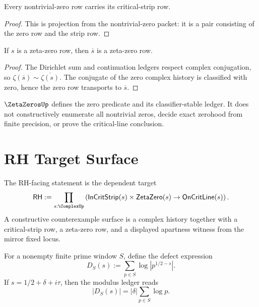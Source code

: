 \begin{theorem}
\label{thm:number-theory-spine-nontrivial-zero-strip}
Every nontrivial-zero row carries its critical-strip row.
\end{theorem}

\begin{proof}
This is projection from the nontrivial-zero packet: it is a pair consisting
of the zero row and the strip row.
\end{proof}

\begin{theorem}
\label{thm:number-theory-spine-zero-conjugate}
If $s$ is a zeta-zero row, then $\overline{s}$ is a zeta-zero row.
\end{theorem}

\begin{proof}
The Dirichlet sum and continuation ledgers respect complex conjugation, so
$\zeta(\overline{s})\sim\overline{\zeta(s)}$.  The conjugate of the zero
complex history is classified with zero, hence the zero row transports to
$\overline{s}$.
\end{proof}

\begin{principle}
\label{prin:number-theory-spine-zero-enumeration-boundary}
$\ZetaZerosUp$ defines the zero predicate and its classifier-stable ledger.  It
does not constructively enumerate all nontrivial zeros, decide exact zerohood
from finite precision, or prove the critical-line conclusion.
\end{principle}

\section{RH Target Surface}
\label{sec:number-theory-spine-rh}

\begin{definition}[RH predicate]
\label{def:number-theory-spine-rh}
The RH-facing statement is the dependent target
$$
\mathsf{RH}
:=
\prod_{s:\ComplexUp}
\left(
\mathsf{InCritStrip}(s)\times\mathsf{ZetaZero}(s)
\to
\mathsf{OnCritLine}(s)
\right).
$$
A constructive counterexample surface is a complex history together with a
critical-strip row, a zeta-zero row, and a displayed apartness witness from
the mirror fixed locus.
\end{definition}

\begin{definition}
\label{def:number-theory-spine-prime-window-defect}
For a nonempty finite prime window $S$, define the defect expression
$$
D_S(s):=\sum_{p\in S}\log |p^{1/2-s}|.
$$
If $s=1/2+\delta+i\tau$, then the modulus ledger reads
$$
|D_S(s)|=|\delta|\sum_{p\in S}\log p.
$$
\end{definition}


